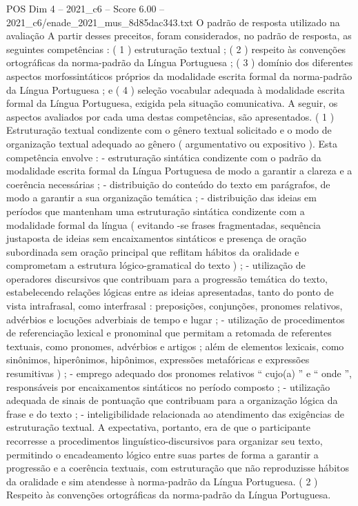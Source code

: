 \begin{textsample}{POS Dim 4 – 2021\_c6 – Score 6.00 – 2021\_c6/enade\_2021\_mus\_8d85dac343.txt}
O padrão de resposta utilizado na avaliação A partir desses preceitos, foram considerados, no padrão de resposta, as seguintes competências : ( 1 ) estruturação textual ; ( 2 ) respeito às convenções ortográficas da norma-padrão da Língua Portuguesa ; ( 3 ) domínio dos diferentes aspectos morfossintáticos próprios da modalidade escrita formal da norma-padrão da Língua Portuguesa ; e ( 4 ) seleção vocabular adequada à modalidade escrita formal da Língua Portuguesa, exigida pela situação comunicativa.
A seguir, os aspectos avaliados por cada uma destas competências, são apresentados. ( 1 ) Estruturação textual condizente com o gênero textual solicitado e o modo de organização textual adequado ao gênero ( argumentativo ou expositivo ).
Esta competência envolve : - estruturação sintática condizente com o padrão da modalidade escrita formal da Língua Portuguesa de modo a garantir a clareza e a coerência necessárias ; - distribuição do conteúdo do texto em parágrafos, de modo a garantir a sua organização temática ; - distribuição das ideias em períodos que mantenham uma estruturação sintática condizente com a modalidade formal da língua ( evitando -se frases fragmentadas, sequência justaposta de ideias sem encaixamentos sintáticos e presença de oração subordinada sem oração principal que reflitam hábitos da oralidade e comprometam a estrutura lógico-gramatical do texto ) ; - utilização de operadores discursivos que contribuam para a progressão temática do texto, estabelecendo relações lógicas entre as ideias apresentadas, tanto do ponto de vista intrafrasal, como interfrasal : preposições, conjunções, pronomes relativos, advérbios e locuções adverbiais de tempo e lugar ; - utilização de procedimentos de referenciação lexical e pronominal que permitam a retomada de referentes textuais, como pronomes, advérbios e artigos ; além de elementos lexicais, como sinônimos, hiperônimos, hipônimos, expressões metafóricas e expressões resumitivas ) ; - emprego adequado dos pronomes relativos “ cujo(a) ” e “ onde ”, responsáveis por encaixamentos sintáticos no período composto ; - utilização adequada de sinais de pontuação que contribuam para a organização lógica da frase e do texto ; - inteligibilidade relacionada ao atendimento das exigências de estruturação textual.
A expectativa, portanto, era de que o participante recorresse a procedimentos linguístico-discursivos para organizar seu texto, permitindo o encadeamento lógico entre suas partes de forma a garantir a progressão e a coerência textuais, com estruturação que não reproduzisse hábitos da oralidade e sim atendesse à norma-padrão da Língua Portuguesa. ( 2 ) Respeito às convenções ortográficas da norma-padrão da Língua Portuguesa.

\end{textsample}

